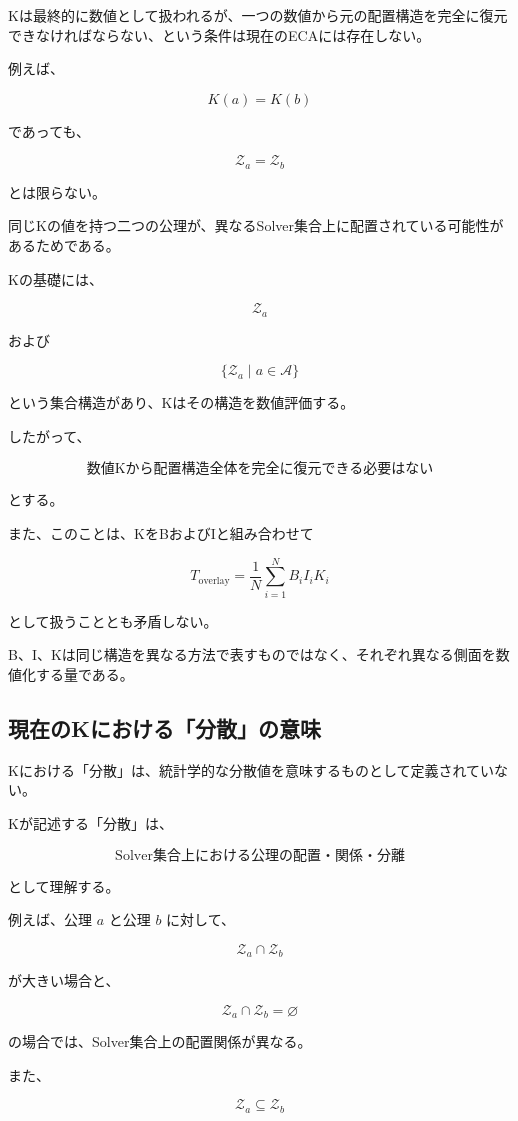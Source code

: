 Kは最終的に数値として扱われるが、一つの数値から元の配置構造を完全に復元できなければならない、という条件は現在のECAには存在しない。

例えば、

\[
K(a)=K(b)
\]

であっても、

\[
\mathcal{Z}_a=\mathcal{Z}_b
\]

とは限らない。

同じKの値を持つ二つの公理が、異なるSolver集合上に配置されている可能性があるためである。

Kの基礎には、

\[
\mathcal{Z}_a
\]

および

\[
\{\mathcal{Z}_a\mid a\in\mathcal{A}\}
\]

という集合構造があり、Kはその構造を数値評価する。

したがって、

\[
\boxed{
\text{数値Kから配置構造全体を完全に復元できる必要はない}
}
\]

とする。

また、このことは、KをBおよびIと組み合わせて

\[
T_{\mathrm{overlay}} = \frac{1}{N}\sum_{i=1}^{N}B_iI_iK_i
\]

として扱うこととも矛盾しない。

B、I、Kは同じ構造を異なる方法で表すものではなく、それぞれ異なる側面を数値化する量である。

\subsection{現在のKにおける「分散」の意味}

Kにおける「分散」は、統計学的な分散値を意味するものとして定義されていない。

Kが記述する「分散」は、

\[
\boxed{
\text{Solver集合上における公理の配置・関係・分離}
}
\]

として理解する。

例えば、公理 $a$ と公理 $b$ に対して、

\[
\mathcal{Z}_a\cap\mathcal{Z}_b
\]

が大きい場合と、

\[
\mathcal{Z}_a\cap\mathcal{Z}_b=\varnothing
\]

の場合では、Solver集合上の配置関係が異なる。

また、

\[
\mathcal{Z}_a\subseteq\mathcal{Z}_b
\]

